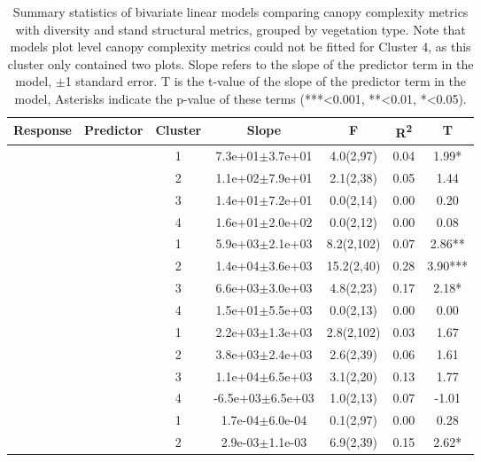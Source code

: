 \begin{longtable}{llccccS[table-format=-2.2, table-space-text-post = {***}]}
\caption{Summary statistics of bivariate linear models comparing canopy complexity metrics with diversity and stand structural metrics, grouped by vegetation type. Note that models plot level canopy complexity metrics could not be fitted for Cluster 4, as this cluster only contained two plots. Slope refers to the slope of the predictor term in the model, $\pm$1 standard error.  T is the t-value of the slope of the predictor term in the model, Asterisks indicate the p-value of these terms (***<0.001, **<0.01, *<0.05).} \\ 
  \toprule
{Response} & {Predictor} & {Cluster} & {Slope} & {F} & {R\textsuperscript{2}} & {T} \\ 
  \midrule
{} & {} & 1 &  7.3e+01$\pm$3.7e+01 & 4.0(2,97) & 0.04 & 1.99* \\ 
   &  & 2 &  1.1e+02$\pm$7.9e+01 & 2.1(2,38) & 0.05 & 1.44 \\ 
   &  & 3 &  1.4e+01$\pm$7.2e+01 & 0.0(2,14) & 0.00 & 0.20 \\ 
   &  & 4 &  1.6e+01$\pm$2.0e+02 & 0.0(2,12) & 0.00 & 0.08 \\ 
   \midrule
{} & {} & 1 &  5.9e+03$\pm$2.1e+03 & 8.2(2,102) & 0.07 & 2.86** \\ 
   &  & 2 &  1.4e+04$\pm$3.6e+03 & 15.2(2,40) & 0.28 & 3.90*** \\ 
   &  & 3 &  6.6e+03$\pm$3.0e+03 & 4.8(2,23) & 0.17 & 2.18* \\ 
   &  & 4 &  1.5e+01$\pm$5.5e+03 & 0.0(2,13) & 0.00 & 0.00 \\ 
   \midrule
{} & {} & 1 &  2.2e+03$\pm$1.3e+03 & 2.8(2,102) & 0.03 & 1.67 \\ 
   &  & 2 &  3.8e+03$\pm$2.4e+03 & 2.6(2,39) & 0.06 & 1.61 \\ 
   &  & 3 &  1.1e+04$\pm$6.5e+03 & 3.1(2,20) & 0.13 & 1.77 \\ 
   &  & 4 & -6.5e+03$\pm$6.5e+03 & 1.0(2,13) & 0.07 & -1.01 \\ 
   \midrule
{} & {} & 1 &  1.7e-04$\pm$6.0e-04 & 0.1(2,97) & 0.00 & 0.28 \\ 
   &  & 2 &  2.9e-03$\pm$1.1e-03 & 6.9(2,39) & 0.15 & 2.62* \\ 

\end{longtable}
